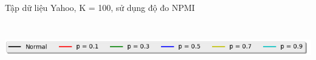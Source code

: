 \documentclass[pdf]{beamer}
\begin{document}
\begin{frame}{Tập dữ liệu Yahoo, K = 100, sử dụng độ đo NPMI }
\begin{columns}[T] %
\begin{column}{.50\textwidth}
	\begin{figure}
	\end{figure}
\end{column} %
\hfill%
\begin{column}{.50\textwidth}
	\begin{figure}
	\end{figure}				
\end{column} %
\end{columns}
\begin{center}
\includegraphics[width=1\textwidth]{menu.png}	
\end{center}
\end{frame}
\end{document}
